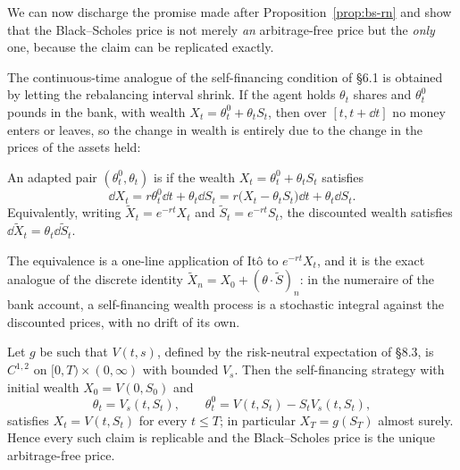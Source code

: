 \documentclass[a4paper]{scrartcl}
\begin{document}
We can now discharge the promise made after Proposition~\ref{prop:bs-rn} and show that the Black--Scholes price is not merely \emph{an} arbitrage-free price but the \emph{only} one, because the claim can be replicated exactly.

The continuous-time analogue of the self-financing condition of \S6.1 is obtained by letting the rebalancing interval shrink. If the agent holds $\theta_t$ shares and $\theta^0_t$ pounds in the bank, with wealth $X_t = \theta^0_t + \theta_tS_t$, then over $[t, t+\dd t]$ no money enters or leaves, so the change in wealth is entirely due to the change in the prices of the assets held:

\begin{definition}
	An adapted pair $(\theta^0_t,\theta_t)$ is  if the wealth $X_t = \theta_t^0 + \theta_tS_t$ satisfies
	$$
	\dd X_t = r\theta^0_t\dd t + \theta_t\dd S_t = r\big(X_t - \theta_tS_t\big)\dd t + \theta_t\dd S_t.
	$$
	Equivalently, writing $\tilde X_t = e^{-rt}X_t$ and $\tilde S_t = e^{-rt}S_t$, the discounted wealth satisfies $\dd\tilde X_t = \theta_t\dd\tilde S_t$.
\end{definition}

The equivalence is a one-line application of It\^o to $e^{-rt}X_t$, and it is the exact analogue of the discrete identity $\tilde X_n = X_0 + (\theta\cdot\tilde S)_n$: in the numeraire of the bank account, a self-financing wealth process is a stochastic integral against the discounted prices, with no drift of its own.

\begin{theorem}\label{thm:bs-complete}
	Let $g$ be such that $V(t,s)$, defined by the risk-neutral expectation of \S8.3, is $C^{1,2}$ on $[0,T)\times(0,\infty)$ with bounded $V_s$. Then the self-financing strategy with initial wealth $X_0 = V(0,S_0)$ and
	$$
	\theta_t = V_s(t,S_t), \qquad \theta^0_t = V(t,S_t) - S_tV_s(t,S_t),
	$$
	satisfies $X_t = V(t,S_t)$ for every $t\leq T$; in particular $X_T = g(S_T)$ almost surely. Hence every such claim is replicable and the Black--Scholes price is the unique arbitrage-free price.
\end{theorem}
\end{document}
